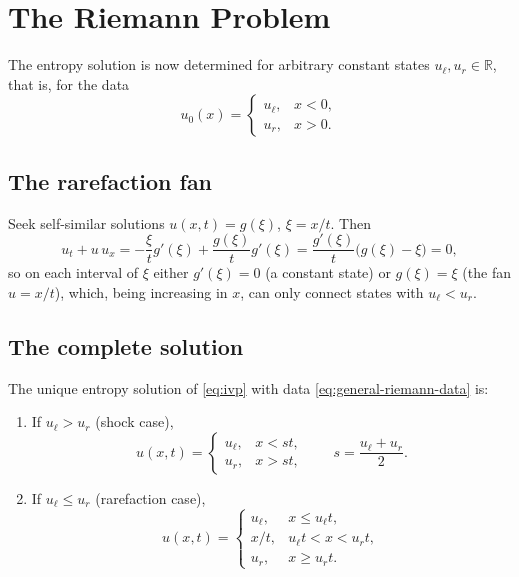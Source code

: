 
\section{The Riemann Problem}
\label{sec:riemann-problem}

The entropy solution is now determined for arbitrary constant states
$u_\ell, u_r \in \mathbb{R}$, that is, for the data
\begin{equation}
  \label{eq:general-riemann-data}
  u_0(x) = \begin{cases} u_\ell, & x<0, \\ u_r, & x>0. \end{cases}
\end{equation}

\subsection{The rarefaction fan}
\label{subsec:rarefaction-general}

Seek self-similar solutions $u(x,t)=g(\xi)$, $\xi=x/t$. Then
\begin{equation}
  u_t + u\,u_x = -\frac{\xi}{t}g'(\xi) + \frac{g(\xi)}{t}g'(\xi)
  = \frac{g'(\xi)}{t}\big(g(\xi)-\xi\big) = 0,
\end{equation}
so on each interval of $\xi$ either $g'(\xi)=0$ (a constant state) or
$g(\xi)=\xi$ (the fan $u=x/t$), which, being increasing in $x$, can only connect
states with $u_\ell<u_r$.

\subsection{The complete solution}
\label{subsec:riemann-complete}

\begin{theorem}
\label{thm:riemann-solution}
The unique entropy solution of \eqref{eq:ivp} with data
\eqref{eq:general-riemann-data} is:
\begin{enumerate}
  \item[\textup{(a)}] If $u_\ell > u_r$ (shock case),
  \begin{equation}
    \label{eq:riemann-shock}
    u(x,t) = \begin{cases} u_\ell, & x < st, \\ u_r, & x > st, \end{cases}
    \qquad s = \frac{u_\ell+u_r}{2}.
  \end{equation}
  \item[\textup{(b)}] If $u_\ell \leq u_r$ (rarefaction case),
  \begin{equation}
    \label{eq:riemann-rarefaction}
    u(x,t) = \begin{cases}
      u_\ell, & x \le u_\ell t, \\
      x/t, & u_\ell t < x < u_r t, \\
      u_r, & x \ge u_r t.
    \end{cases}
  \end{equation}
\end{enumerate}
\end{theorem}

